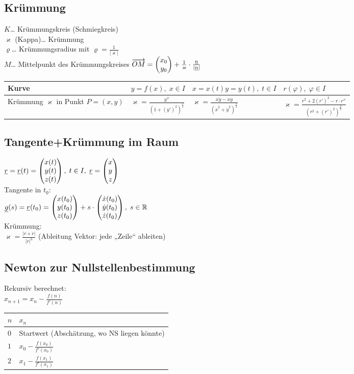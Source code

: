 \subsection{Krümmung}
$K$… Krümmungskreis (Schmiegkreis)\\
$\varkappa$ (Kappa)… Krümmung\\
$\varrho$… Krümmungsradius mit $\varrho=\frac{1}{|\varkappa|}$\\
$M$… Mittelpunkt des Krümmungskreises $\overrightarrow{OM}=\begin{pmatrix}x_0 \\ y_0\end{pmatrix}+\frac{1}{\varkappa}\cdot \frac{\underline{n}}{|\underline{n}|}$\\
\begin{tabular}{L{.2} | L{.3} | L{.199} | L{.3}}
Kurve & $y=f(x),\;x\in I$ & $x=x(t)$\newline $y=y(t), \; t\in I$ & $r(\varphi), \; \varphi \in I$ \\
\hline 
Krümmung $\varkappa$ in Punkt $P=(x,y)$ & $\varkappa=\frac{y''}{(1+(y')^2)^{\tfrac{3}{2}}}$ & $\varkappa=\frac{\dot{x}\ddot{y}-\ddot{x}\dot{y}}{(\dot{x}^2+\dot{y}^2)^{\tfrac{3}{2}}}$ & $\varkappa=\frac{r^2+2(r')^2-r\cdot r''}{(r^2+(r')^2)^{\tfrac{3}{2}}}$
\end{tabular}

\subsection{Tangente+Krümmung im Raum}
$\underline{r}=\underline{r}(t)=\begin{pmatrix}x(t)\\y(t)\\z(t)\end{pmatrix}, \; t \in I, \; \underline{r}=\begin{pmatrix}x\\ y \\ z\end{pmatrix}$\\
Tangente in $t_0$:\\
$\underline{g}(s)=\underline{r}(t_0)=\begin{pmatrix}x(t_0)\\y(t_0)\\z(t_0)\end{pmatrix}+s\cdot \begin{pmatrix}\dot{x}(t_0)\\\dot{y}(t_0)\\\dot{z}(t_0)\end{pmatrix}, \; s \in \mathbb{R}$\\
Krümmung:\\
$\varkappa = \frac{|\dot{r}\times \ddot{r}|}{|\dot{r}|^3}$ (Ableitung Vektor: jede „Zeile“ ableiten)

\subsection{Newton zur Nullstellenbestimmung}
Rekursiv berechnet:\\
$x_{n+1}=x_n-\frac{f(n)}{f'(n)}$\\
\begin{tabular}{l | l}
$n$ & $x_n$\\
\hline 
$0$ & Startwert (Abschätzung, wo NS liegen könnte)\\
$1$ & $x_0-\frac{f(x_0)}{f'(x_0)}$\\
$2$ & $x_1-\frac{f(x_1)}{f'(x_1)}$
\end{tabular}

